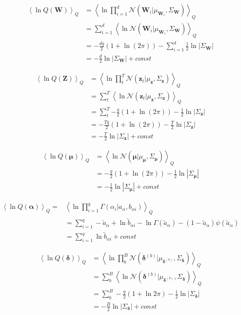 \documentclass[10pt]{article}
\newcommand{\Angle}[1]{\left \langle #1 \right \rangle}
\newcommand{\Eq}[1]{\Angle{#1}_Q}
\newcommand{\N}[2][]{\mathcal{N} \left( #1,#2 \right)}
\newcommand{\Det}[1]{\left| #1 \right|}
\begin{document}
    \begin{align}
        \Eq{\ln{Q(\bm{W})}}&=\Eq{\ln{\prod_{i=1}^d{\N[\bm{W}_i | \mu_{\bm{W}_i}]{\Sigma_{\bm{W}}}}}} \nonumber\\
        &=\sum_{i=1}^d{\Eq{\ln{\N[{\bm{W}_i} | \mu_{\bm{W}_i}]{\Sigma_{\bm{W}}}}}} \nonumber \\
        &=-\frac{dq}{2}(1+\ln(2\pi)) - \sum_{i=1}^d{\frac{1}{2}\ln{\Det{\Sigma_{\bm{W}}}}}  \nonumber \\
        &=-\frac{d}{2}\ln{\Det{\Sigma_{\bm{W}}}} + const
        \label{qw}
    \end{align}

    \begin{align}
        \Eq{\ln{Q(\bm{Z})}}&=\Eq{\ln{\prod_t^T{\N[\bm{z}_t| \mu_{\bm{z}}]{\Sigma_{\bm{z}}}}}} \nonumber \\
        &=\sum_t^T{\Eq{\ln{\N[\bm{z}_t \vert \mu_{\bm{z}}]{\Sigma_{\bm{z}}}}}} \nonumber \\
        &=\sum_t^T{-\frac{q}{2}(1+\ln(2\pi)) - \frac{1}{2}\ln{\Det{\Sigma_{\bm{z}}}}} \nonumber \\
        &=-\frac{Tq}{2}( 1+\ln(2\pi)) - \frac{T}{2}\ln{\Det{\Sigma_{\bm{z}}}} \nonumber \\
        &=-\frac{T}{2}\ln{\Det{\Sigma_{\bm{z}}}} + const
        \label{qz}
    \end{align}

    \begin{align}
        \Eq{\ln{Q(\bm{\mu})}}&=\Eq{\ln{\N[\bm{\mu} | \mu_{\bm{\mu}}]{\Sigma_{\bm{\mu}}}}} \nonumber \\
        &=-\frac{q}{2}( 1+\ln(2\pi)) - \frac{1}{2}\ln{\Det{\Sigma_{\bm{\mu}}}} \nonumber \\
        &=-\frac{1}{2}\ln{\Det{\Sigma_{\bm{\mu}}}} + const
        \label{qmu}
    \end{align}

    \begin{align}
        \Eq{\ln{Q(\bm{\alpha})}}=&\Eq{\ln{\prod_{i=1}^q \Gamma(\alpha_i \vert a_\alpha,b_{\alpha i})}} \nonumber \\
        &=\sum_{i=1}^q -\tilde{a}_\alpha+\ln{\tilde{b}_{\alpha i}}-\ln{\Gamma(\tilde{a}_\alpha)}-(1-\tilde{a}_\alpha)\psi(\tilde{a}_\alpha) \nonumber \\
        &=\sum_{i=1}^q \ln{\tilde{b}_{\alpha i}} + const
        \label{qalpha}
    \end{align}

    \begin{align}
        \Eq{\ln{Q(\bm{\delta})}}&= \Eq{\ln{\prod_b^B\mathcal{N}(\bm{\delta}^{(b)}|\mu_{\bm{\delta}^{(b)}}, \Sigma_{\bm{\delta}})}} \nonumber \\
        &=\sum_b^B\Eq{\ln{\mathcal{N}(\bm{\delta}^{(b)}|\mu_{\bm{\delta}^{(b)}},\Sigma_{\bm{\delta}})}} \nonumber \\
        &= \sum_b^B-\frac{q}{2}(1 + \ln{2\pi}) - \frac{1}{2}\ln{|\Sigma_{\bm{\delta}}|}\nonumber \\
        &= -\frac{B}{2}\ln{|\Sigma_{\bm{\delta}}|} + const
        \label{qdelta}
    \end{align}
\end{document}
